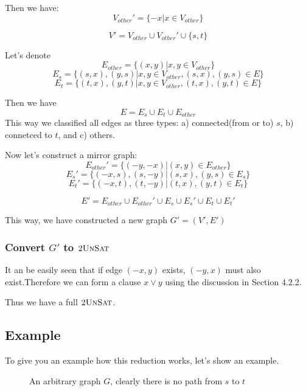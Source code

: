 Then we have: $$V_{other}' = \{-x | x \in V_{other}\}$$

$$V' = V_{other} \cup V_{other}' \cup \{s, t\}$$

Let's denote
$$E_{other} = \{(x, y) | x, y \in V_{other}\}$$
$$E_s = \{(s, x), (y, s) | x, y \in V_{other}, (s, x), (y, s) \in E\}$$
$$E_t = \{(t, x), (y, t) | x, y \in V_{other}, (t, x), (y, t) \in E \}$$

Then we have $$E = E_s \cup E_t \cup E_{other}$$
This way we classified all edges as three types: a) connected(from or to) $s$, b) connetced to $t$, and c) others.

Now let's construct a mirror graph:
$$E_{other}' = \{(-y, -x) | (x, y) \in E_{other}\}$$
$$E_s' = \{(-x, s), (s, -y) | (s, x), (y, s) \in E_s\}$$
$$E_t' = \{(-x, t), (t, -y) | (t, x), (y, t) \in E_t\}$$

$$E' = E_{other} \cup E_{other}' \cup E_s \cup E_s' \cup E_t \cup E_t' $$

This way, we have constructed a new graph $G' = (V', E')$

\subsubsection*{Convert $G'$ to $2\textsc{UnSat}$}

It an be easily seen that if edge $(-x, y)$ exists, $(-y, x)$ must also exist.Therefore we can form a clause $x \vee y$ using the discussion in Section 4.2.2.

Thus we have a full $2\textsc{UnSat}$.

\subsection*{Example}

To give you an example how this reduction works, let's show an example.

\begin{figure}[h]
      \centering
      \caption{An arbitrary graph $G$, clearly there is no path from $s$ to $t$}
\end{figure}


